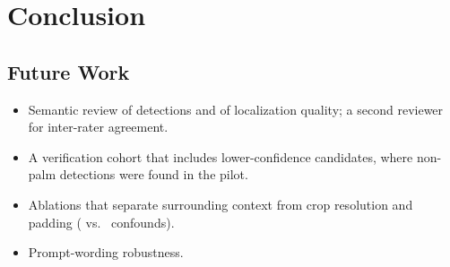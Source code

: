 \section{Conclusion}
\label{sec:conclusion}


\subsection{Future Work}
\begin{itemize}
  \item Semantic review of \matched{} detections and of localization quality; a second reviewer for inter-rater agreement.
  \item A verification cohort that includes lower-confidence candidates, where non-palm detections were found in the pilot.
  \item Ablations that separate surrounding context from crop resolution and padding ( vs.\  confounds).
  \item Prompt-wording robustness.
\end{itemize}
